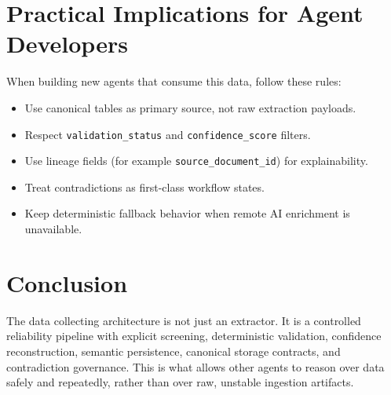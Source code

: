 \documentclass[11pt,a4paper]{article}
\begin{document}
\section{Practical Implications for Agent Developers}
When building new agents that consume this data, follow these rules:
\begin{itemize}[leftmargin=*]
  \item Use canonical tables as primary source, not raw extraction payloads.
  \item Respect \texttt{validation\_status} and \texttt{confidence\_score} filters.
  \item Use lineage fields (for example \texttt{source\_document\_id}) for explainability.
  \item Treat contradictions as first-class workflow states.
  \item Keep deterministic fallback behavior when remote AI enrichment is unavailable.
\end{itemize}

\section{Conclusion}
The data collecting architecture is not just an extractor. It is a controlled reliability pipeline with explicit screening, deterministic validation, confidence reconstruction, semantic persistence, canonical storage contracts, and contradiction governance. This is what allows other agents to reason over data safely and repeatedly, rather than over raw, unstable ingestion artifacts.
\end{document}
